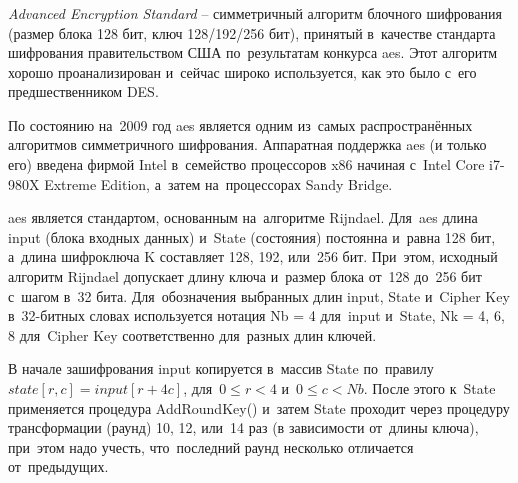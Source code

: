 \subsubsection{}
\label{sec:analysis:research:crypto:aes}

\emph{Advanced Encryption Standard} -- симметричный алгоритм блочного шифрования (размер блока 128 бит, ключ 128/192/256 бит), принятый в~качестве стандарта шифрования правительством США по~результатам конкурса \gls{aes}. Этот алгоритм хорошо проанализирован и~сейчас широко используется, как это было с~его предшественником DES\cite{wiki:aes}.

По состоянию на~2009 год \gls{aes} является одним из~самых распространённых алгоритмов симметричного шифрования\cite{thg:aes}. Аппаратная поддержка \gls{aes} (и только его) введена фирмой Intel в~семейство процессоров x86 начиная с~Intel Core i7-980X Extreme Edition, а~затем на~процессорах Sandy Bridge.

\gls{aes} является стандартом, основанным на~алгоритме Rijndael. Для~\gls{aes} длина input (блока входных данных) и~State (состояния) постоянна и~равна 128 бит, а~длина шифроключа K составляет 128, 192, или~256 бит. При~этом, исходный алгоритм Rijndael допускает длину ключа и~размер блока от~128 до~256 бит с~шагом в~32 бита. Для~обозначения выбранных длин input, State и~Cipher Key в~32-битных словах используется нотация Nb = 4 для~input и~State, Nk = 4, 6, 8 для~Cipher Key соответственно для~разных длин ключей.

В начале зашифрования input копируется в~массив State по~правилу \(state[r,c]=input[r+4c]\), для~\(0 \leq r < 4\) и~\(0 \leq c < Nb\). После этого к~State применяется процедура AddRoundKey() и~затем State проходит через процедуру трансформации (раунд) 10, 12, или~14 раз (в зависимости от~длины ключа), при~этом надо учесть, что~последний раунд несколько отличается от~предыдущих.
